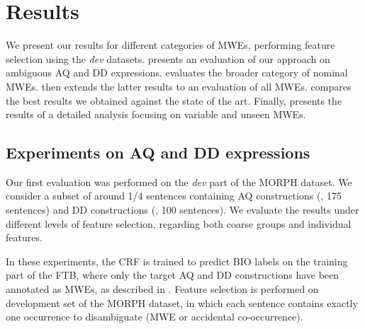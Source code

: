 \documentclass[output=paper,
modfonts
]{langscibook}
\begin{document}
\section{Results}
\label{schol:sec:results}

We present our results for different categories of MWEs, performing  feature selection using the \emph{dev} datasets. 
 presents an evaluation of our approach on ambiguous AQ and DD expressions. 
 evaluates the broader category of nominal MWEs. 
 then extends the latter results to an evaluation of all MWEs. 
 compares the best results we obtained against the state of the art.
Finally,  presents the results of a detailed analysis focusing on variable and unseen MWEs.




\subsection{Experiments on AQ and DD expressions}
\label{schol:sec:results-ambig}

Our first evaluation was performed on the \emph{dev} part of the MORPH dataset. We consider a subset of around 1/4 sentences containing AQ constructions (\devAQ{}, 175 sentences) and DD constructions (\devDD{}, 100 sentences).
We evaluate the results under different levels of feature selection, regarding both coarse groups and individual features.

In these experiments, the CRF is trained to predict BIO labels on the training part of the FTB, where only the target AQ and DD constructions have been annotated as MWEs, as described in . Feature selection is performed on development set of the MORPH dataset, in which each sentence contains exactly one occurrence to disambiguate (MWE or accidental co-occurrence).
\end{document}
